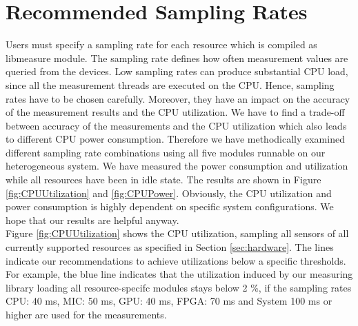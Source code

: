 %
%
%
%
%
%

\section{Recommended Sampling Rates} \label{app:A}
Users must specify a sampling rate for each resource which is compiled as libmeasure module. The sampling rate defines how often measurement values are queried from the devices. Low sampling rates can produce substantial CPU load, since all the measurement threads are executed on the CPU. Hence, sampling rates have to be chosen carefully. Moreover, they have an impact on the accuracy of the measurement results and the CPU utilization. We have to find a trade-off between accuracy of the measurements and the CPU utilization which also leads to different CPU power consumption. Therefore we have methodically examined different sampling rate combinations using all five modules runnable on our heterogeneous system.   We have measured the power consumption and utilization while all resources have been in idle state. The results are shown in Figure \ref{fig:CPUUtilization} and \ref{fig:CPUPower}. Obviously, the CPU utilization and power consumption is highly dependent on specific system configurations. We hope that our results are helpful anyway.\\

Figure \ref{fig:CPUUtilization} shows the CPU utilization, sampling all sensors of all currently supported resources as specified in Section \ref{sec:hardware}. The lines indicate our recommendations to achieve utilizations below a specific thresholds. For example, the blue line indicates that the utilization induced by our measuring library loading all resource-specifc modules stays below 2 \%, if the sampling rates CPU: 40 ms, MIC: 50 ms, GPU: 40 ms, FPGA: 70 ms and System 100 ms or higher are used for the measurements.

